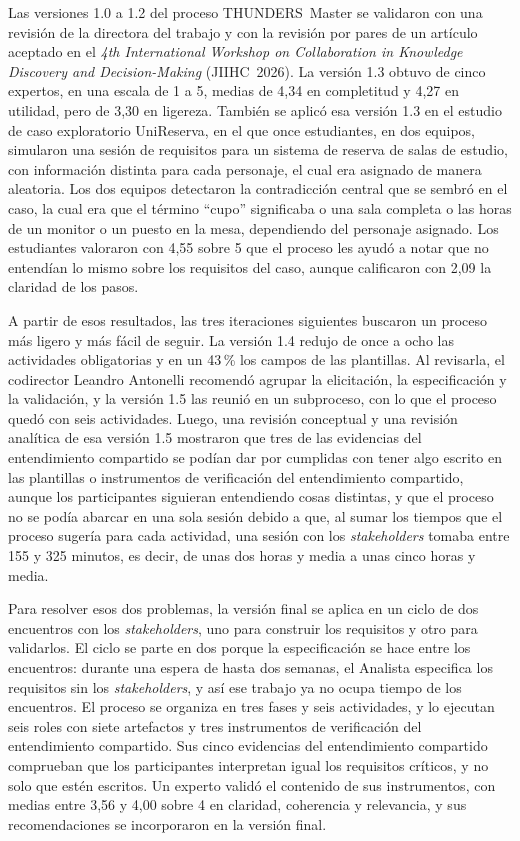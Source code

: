 \documentclass[12pt,letterpaper,oneside]{report}
\begin{document}
Las versiones 1.0 a 1.2 del proceso THUNDERS~Master se validaron con una
revisión de la directora del trabajo y con la revisión por pares de un artículo
aceptado en el \textit{4th International Workshop on Collaboration in Knowledge
Discovery and Decision-Making} (JIIHC~2026). La versión 1.3 obtuvo de cinco
expertos, en una escala de 1 a 5, medias de 4,34 en completitud y 4,27 en
utilidad, pero de 3,30 en ligereza. También se aplicó esa versión 1.3 en el
estudio de caso exploratorio UniReserva, en el que once estudiantes, en dos
equipos, simularon una sesión de requisitos para un sistema de reserva de salas
de estudio, con información distinta para cada personaje, el cual era asignado
de manera aleatoria. Los dos equipos detectaron la contradicción central que se
sembró en el caso, la cual era que el término ``cupo'' significaba o una sala
completa o las horas de un monitor o un puesto en la mesa, dependiendo del
personaje asignado. Los estudiantes valoraron con 4,55 sobre 5 que el proceso
les ayudó a notar que no entendían lo mismo sobre los requisitos del caso,
aunque calificaron con 2,09 la claridad de los pasos.

A partir de esos resultados, las tres iteraciones siguientes buscaron un proceso
más ligero y más fácil de seguir. La versión 1.4 redujo de once a ocho las
actividades obligatorias y en un 43\,\% los campos de las plantillas. Al
revisarla, el codirector Leandro Antonelli recomendó agrupar la elicitación, la
especificación y la validación, y la versión 1.5 las reunió en un subproceso,
con lo que el proceso quedó con seis actividades. Luego, una revisión conceptual
y una revisión analítica de esa versión 1.5 mostraron que tres de las evidencias
del entendimiento compartido se podían dar por cumplidas con tener algo escrito
en las plantillas o instrumentos de verificación del entendimiento compartido,
aunque los participantes siguieran entendiendo cosas distintas, y que el proceso
no se podía abarcar en una sola sesión debido a que, al sumar los tiempos que el
proceso sugería para cada actividad, una sesión con los \textit{stakeholders}
tomaba entre 155 y 325 minutos, es decir, de unas dos horas y media a unas cinco
horas y media.

Para resolver esos dos problemas, la versión final se aplica en un ciclo de dos
encuentros con los \textit{stakeholders}, uno para construir los requisitos y
otro para validarlos. El ciclo se parte en dos porque la especificación se hace
entre los encuentros: durante una espera de hasta dos semanas, el Analista
especifica los requisitos sin los \textit{stakeholders}, y así ese trabajo ya no
ocupa tiempo de los encuentros. El proceso se organiza en tres fases y seis
actividades, y lo ejecutan seis roles con siete artefactos y tres instrumentos
de verificación del entendimiento compartido. Sus cinco evidencias del
entendimiento compartido comprueban que los participantes interpretan igual los
requisitos críticos, y no solo que estén escritos. Un experto validó el
contenido de sus instrumentos, con medias entre 3,56 y 4,00 sobre 4 en claridad,
coherencia y relevancia, y sus recomendaciones se incorporaron en la versión
final.
\end{document}
